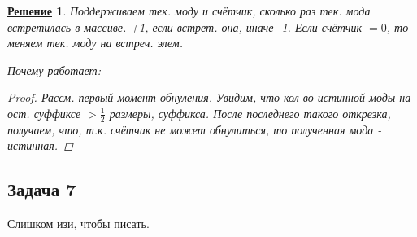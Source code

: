 \documentclass[a4, 12pt]{article}
\newtheorem*{solution}{\underline{Решение}}
\theoremstyle{definition}
\begin{document}
\begin{solution}
Поддерживаем тек. моду и счётчик, сколько раз тек. мода встретилась в массиве. +1, если встрет. она, иначе -1. Если счётчик $ = 0$, то меняем тек. моду на встреч. элем.

Почему работает:
\begin{proof}
    Рассм. первый момент обнуления. Увидим, что кол-во истинной моды на ост. суффиксе $> \frac{1}{2}$ размеры, суффикса. После последнего такого открезка, получаем, что, т.к. счётчик не может обнулиться, то полученная мода - истинная.
\end{proof}

\end{solution}

\subsection{Задача 7}
Слишком изи, чтобы писать.
\end{document}
